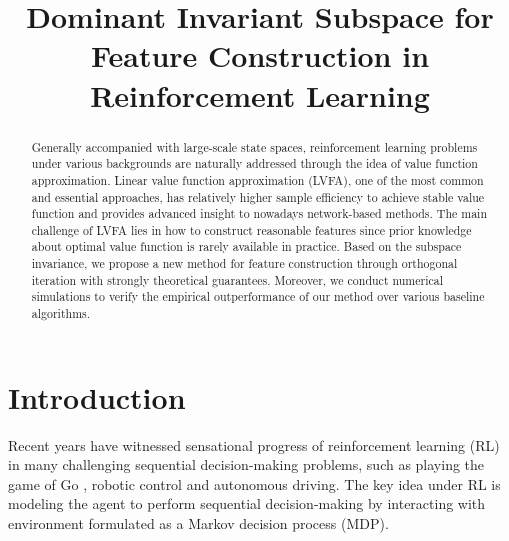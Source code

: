 \documentclass[onecolumn, conference]{IEEEtran}
\begin{document}
\title{ Dominant Invariant Subspace for\\Feature Construction in Reinforcement Learning
}

\author{

\and
{}
}

\maketitle

\begin{abstract}
	 Generally accompanied with large-scale state spaces, reinforcement learning problems under various backgrounds are naturally addressed through the idea of value function approximation. Linear value function approximation (LVFA), one of the most common and essential approaches, has relatively higher sample efficiency to achieve stable value function and provides advanced insight to nowadays network-based methods. The main challenge of LVFA lies in how to construct reasonable features since prior knowledge about optimal value function is rarely available in practice. Based on the 
	subspace invariance, we propose a new method for feature construction through orthogonal iteration with strongly theoretical guarantees. Moreover, we conduct numerical simulations to verify the empirical outperformance of our method over various baseline algorithms. 
\end{abstract}

\section{Introduction}\label{sec:introduction}

	Recent years have witnessed sensational progress of reinforcement learning (RL) in many challenging sequential decision-making problems, such as playing the game of Go \cite{Mnih2013PlayingAW}\cite{ Silver2017MasteringTG}, robotic control \cite{Lillicrap2016ContinuousCW} and autonomous driving\cite{ShalevShwartz2016SafeMR}. The key idea under RL is modeling the agent to perform sequential decision-making by interacting with environment formulated as a Markov decision process (MDP). 
\end{document}
